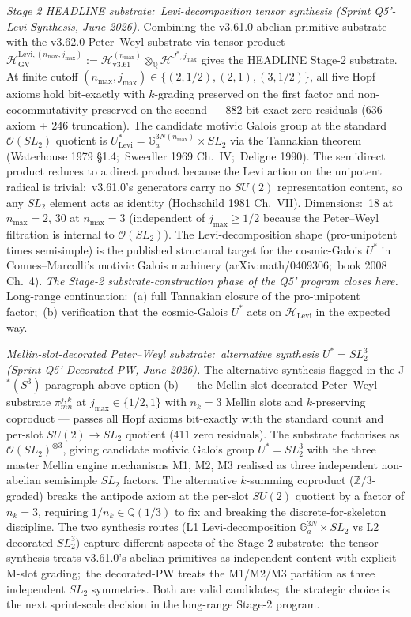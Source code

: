 \documentclass[11pt,a4paper]{article}
\theoremstyle{plain}
\theoremstyle{definition}
\newcommand{\Q}{\mathbb{Q}}
\begin{document}
\emph{Stage 2 HEADLINE substrate:\ Levi-decomposition tensor synthesis
(Sprint Q5'-Levi-Synthesis, June 2026).}  Combining the
v3.61.0 abelian primitive substrate with the v3.62.0 Peter--Weyl
substrate via tensor product
$\mathcal{H}_{\mathrm{GV}}^{\mathrm{Levi}, (n_{\max}, j_{\max})}
:= \mathcal{H}_{\mathrm{v3.61}}^{(n_{\max})} \otimes_{\Q} \mathcal{H}^{J^*, j_{\max}}$
gives the HEADLINE Stage-2 substrate.  At finite cutoff
$(n_{\max}, j_{\max}) \in \{(2, 1/2), (2, 1), (3, 1/2)\}$, all five Hopf
axioms hold bit-exactly with $k$-grading preserved on the first factor
and non-cocommutativity preserved on the second --- 882 bit-exact zero
residuals (636 axiom + 246 truncation).  The candidate motivic Galois
group at the standard $\mathcal{O}(SL_2)$ quotient is
$U^*_{\mathrm{Levi}} = \mathbb{G}_a^{3 N(n_{\max})} \times SL_2$ via the
Tannakian theorem (Waterhouse 1979 §1.4;\ Sweedler 1969 Ch.~IV;\
Deligne 1990).  The semidirect product reduces to a direct product
because the Levi action on the unipotent radical is trivial:\ v3.61.0's
generators carry no $SU(2)$ representation content, so any $SL_2$
element acts as identity (Hochschild 1981 Ch.~VII).  Dimensions:\ 18 at
$n_{\max} = 2$, 30 at $n_{\max} = 3$ (independent of $j_{\max} \ge 1/2$
because the Peter--Weyl filtration is internal to $\mathcal{O}(SL_2)$).
The Levi-decomposition shape (pro-unipotent times semisimple) is the
published structural target for the cosmic-Galois $U^*$ in
Connes--Marcolli's motivic Galois machinery (arXiv:math/0409306;\ book
2008 Ch.~4).  \emph{The Stage-2 substrate-construction phase of the
Q5' program closes here.}  Long-range continuation:\ (a) full Tannakian
closure of the pro-unipotent factor;\ (b) verification that the
cosmic-Galois $U^*$ acts on $\mathcal{H}_{\mathrm{Levi}}$ in the
expected way.

\emph{Mellin-slot-decorated Peter--Weyl substrate:\ alternative synthesis
$U^* = SL_2^3$ (Sprint Q5'-Decorated-PW, June 2026).}  The alternative
synthesis flagged in the J$^*(S^3)$ paragraph above option (b) --- the
Mellin-slot-decorated Peter--Weyl substrate $\pi^{j, k}_{mn}$ at
$j_{\max} \in \{1/2, 1\}$ with $n_k = 3$ Mellin slots and
$k$-preserving coproduct --- passes all Hopf axioms bit-exactly with
the standard counit and per-slot $SU(2) \to SL_2$ quotient (411 zero
residuals).  The substrate factorises as
$\mathcal{O}(SL_2)^{\otimes 3}$, giving candidate motivic Galois group
$U^* = SL_2^3$ with the three master Mellin engine mechanisms M1, M2,
M3 realised as three independent non-abelian semisimple $SL_2$ factors.
The alternative $k$-summing coproduct ($\mathbb{Z}/3$-graded) breaks
the antipode axiom at the per-slot $SU(2)$ quotient by a factor of
$n_k = 3$, requiring $1/n_k \in \Q(1/3)$ to fix and breaking the
discrete-for-skeleton discipline.  The two synthesis routes
(L1 Levi-decomposition $\mathbb{G}_a^{3 N} \times SL_2$ vs L2 decorated
$SL_2^3$) capture different aspects of the Stage-2 substrate:\ the
tensor synthesis treats v3.61.0's abelian primitives as independent
content with explicit M-slot grading;\ the decorated-PW treats the
M1/M2/M3 partition as three independent $SL_2$ symmetries.  Both are
valid candidates;\ the strategic choice is the next sprint-scale
decision in the long-range Stage-2 program.
\end{document}

